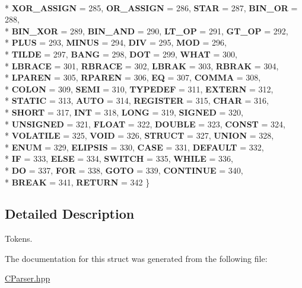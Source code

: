 \begin{DoxyCompactItemize}
\\*
{\bfseries X\-O\-R\-\_\-\-A\-S\-S\-I\-G\-N} = 285, 
{\bfseries O\-R\-\_\-\-A\-S\-S\-I\-G\-N} = 286, 
{\bfseries S\-T\-A\-R} = 287, 
{\bfseries B\-I\-N\-\_\-\-O\-R} = 288, 
\\*
{\bfseries B\-I\-N\-\_\-\-X\-O\-R} = 289, 
{\bfseries B\-I\-N\-\_\-\-A\-N\-D} = 290, 
{\bfseries L\-T\-\_\-\-O\-P} = 291, 
{\bfseries G\-T\-\_\-\-O\-P} = 292, 
\\*
{\bfseries P\-L\-U\-S} = 293, 
{\bfseries M\-I\-N\-U\-S} = 294, 
{\bfseries D\-I\-V} = 295, 
{\bfseries M\-O\-D} = 296, 
\\*
{\bfseries T\-I\-L\-D\-E} = 297, 
{\bfseries B\-A\-N\-G} = 298, 
{\bfseries D\-O\-T} = 299, 
{\bfseries W\-H\-A\-T} = 300, 
\\*
{\bfseries L\-B\-R\-A\-C\-E} = 301, 
{\bfseries R\-B\-R\-A\-C\-E} = 302, 
{\bfseries L\-B\-R\-A\-K} = 303, 
{\bfseries R\-B\-R\-A\-K} = 304, 
\\*
{\bfseries L\-P\-A\-R\-E\-N} = 305, 
{\bfseries R\-P\-A\-R\-E\-N} = 306, 
{\bfseries E\-Q} = 307, 
{\bfseries C\-O\-M\-M\-A} = 308, 
\\*
{\bfseries C\-O\-L\-O\-N} = 309, 
{\bfseries S\-E\-M\-I} = 310, 
{\bfseries T\-Y\-P\-E\-D\-E\-F} = 311, 
{\bfseries E\-X\-T\-E\-R\-N} = 312, 
\\*
{\bfseries S\-T\-A\-T\-I\-C} = 313, 
{\bfseries A\-U\-T\-O} = 314, 
{\bfseries R\-E\-G\-I\-S\-T\-E\-R} = 315, 
{\bfseries C\-H\-A\-R} = 316, 
\\*
{\bfseries S\-H\-O\-R\-T} = 317, 
{\bfseries I\-N\-T} = 318, 
{\bfseries L\-O\-N\-G} = 319, 
{\bfseries S\-I\-G\-N\-E\-D} = 320, 
\\*
{\bfseries U\-N\-S\-I\-G\-N\-E\-D} = 321, 
{\bfseries F\-L\-O\-A\-T} = 322, 
{\bfseries D\-O\-U\-B\-L\-E} = 323, 
{\bfseries C\-O\-N\-S\-T} = 324, 
\\*
{\bfseries V\-O\-L\-A\-T\-I\-L\-E} = 325, 
{\bfseries V\-O\-I\-D} = 326, 
{\bfseries S\-T\-R\-U\-C\-T} = 327, 
{\bfseries U\-N\-I\-O\-N} = 328, 
\\*
{\bfseries E\-N\-U\-M} = 329, 
{\bfseries E\-L\-I\-P\-S\-I\-S} = 330, 
{\bfseries C\-A\-S\-E} = 331, 
{\bfseries D\-E\-F\-A\-U\-L\-T} = 332, 
\\*
{\bfseries I\-F} = 333, 
{\bfseries E\-L\-S\-E} = 334, 
{\bfseries S\-W\-I\-T\-C\-H} = 335, 
{\bfseries W\-H\-I\-L\-E} = 336, 
\\*
{\bfseries D\-O} = 337, 
{\bfseries F\-O\-R} = 338, 
{\bfseries G\-O\-T\-O} = 339, 
{\bfseries C\-O\-N\-T\-I\-N\-U\-E} = 340, 
\\*
{\bfseries B\-R\-E\-A\-K} = 341, 
{\bfseries R\-E\-T\-U\-R\-N} = 342
 \}
\end{DoxyCompactItemize}


\subsection{Detailed Description}
Tokens. 

The documentation for this struct was generated from the following file\-:\begin{DoxyCompactItemize}
\item 
\hyperlink{CParser_8hpp}{C\-Parser.\-hpp}\end{DoxyCompactItemize}
